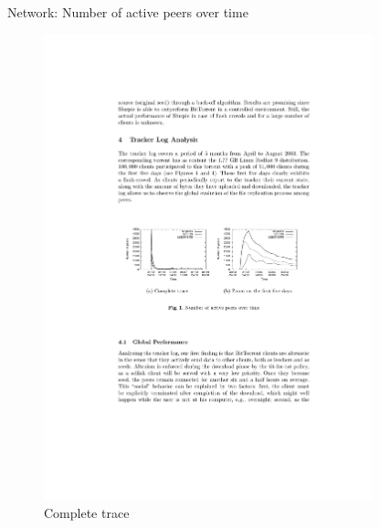 \begin{frame}{Network: Number of active peers over time}
	
\begin{figure}	
	\includegraphics[width=0.85\textwidth]{bt-fig1}
	\caption{Complete trace}
\end{figure}	
	
\end{frame}


